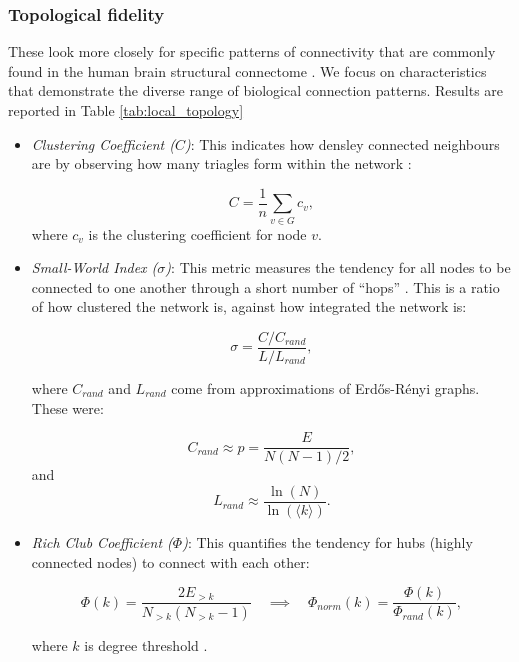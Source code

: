 \documentclass[sigconf, review]{acmart}
\begin{document}
\subsubsection{Topological fidelity} These look more closely for specific patterns of connectivity that are commonly found in the human brain structural connectome \cite{sporns_human_2013}. We focus on characteristics that demonstrate the diverse range of biological connection patterns. Results are reported in Table \ref{tab:local_topology}
\begin{itemize}
    \item \textit{Clustering Coefficient ($C$)}: This indicates how densley connected neighbours are by observing how many triagles form within the network \cite{watts1998collective}:

    \begin{equation}
        C = \frac{1}{n} \sum_{v \in G} c_v ,
    \end{equation}
    where $c_v$ is the clustering coefficient for node $v$.
    
    \item \textit{Small-World Index ($\sigma$)}: This metric measures the tendency for all nodes to be connected to one another through a short number of ``hops'' \cite{humphries2008network}. This is a ratio of how clustered the network is, against how integrated the network is:

    \begin{equation}
        \sigma = \frac{C / C_{rand}}{L / L_{rand}} ,
    \end{equation}

    where $C_{rand}$ and $L_{rand}$ come from approximations of Erdős-Rényi graphs. These were:

    \begin{equation}
        C_{rand} \approx p = \frac{E}{N(N-1)/2} ,
    \end{equation}
    and 
    \begin{equation}
        L_{rand} \approx \frac{\ln(N)}{\ln(\langle k \rangle)}.
    \end{equation}
    
    
    \item \textit{Rich Club Coefficient ($\Phi$)}: This quantifies the tendency for hubs (highly connected nodes) to connect with each other:

    \begin{equation}
        \Phi(k) = \frac{2 E_{>k}}{N_{>k}(N_{>k}-1)} \quad \implies \quad \Phi_{norm}(k) = \frac{\Phi(k)}{\Phi_{rand}(k)},
    \end{equation}

    where $k$ is degree threshold \cite{van2011rich, colizza2006detecting}.
    
\end{itemize}
    
\end{document}
